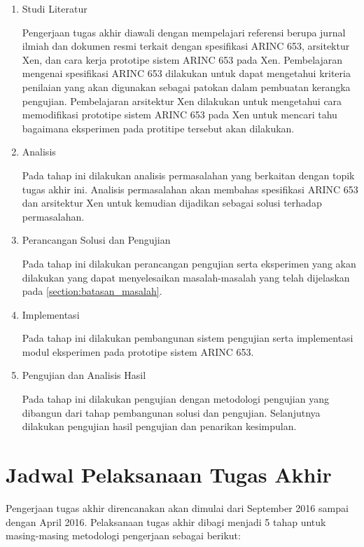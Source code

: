 \begin{enumerate}
    \item Studi Literatur

        Pengerjaan tugas akhir diawali dengan mempelajari referensi berupa jurnal ilmiah dan dokumen resmi terkait dengan spesifikasi ARINC 653, arsitektur Xen, dan cara kerja prototipe sistem ARINC 653 pada Xen.
        Pembelajaran mengenai spesifikasi ARINC 653 dilakukan untuk dapat mengetahui kriteria penilaian yang akan digunakan sebagai patokan dalam pembuatan kerangka pengujian.
        Pembelajaran arsitektur Xen dilakukan untuk mengetahui cara memodifikasi prototipe sistem ARINC 653 pada Xen untuk mencari tahu bagaimana eksperimen pada protitipe tersebut akan dilakukan.

    \item Analisis

        Pada tahap ini dilakukan analisis permasalahan yang berkaitan dengan topik tugas akhir ini.
        Analisis permasalahan akan membahas spesifikasi ARINC 653 dan arsitektur Xen untuk kemudian dijadikan sebagai solusi terhadap permasalahan.

    \item Perancangan Solusi dan Pengujian

        Pada tahap ini dilakukan perancangan pengujian serta eksperimen yang akan dilakukan yang dapat menyelesaikan masalah\hyp{}masalah yang telah dijelaskan pada \autoref{section:batasan_masalah}.

    \item Implementasi

        Pada tahap ini dilakukan pembangunan sistem pengujian serta implementasi modul eksperimen pada prototipe sistem ARINC 653.

    \item Pengujian dan Analisis Hasil

        Pada tahap ini dilakukan pengujian dengan metodologi pengujian yang dibangun dari tahap pembangunan solusi dan pengujian.
        Selanjutnya dilakukan pengujian hasil pengujian dan penarikan kesimpulan.
\end{enumerate}

\section{Jadwal Pelaksanaan Tugas Akhir}

Pengerjaan tugas akhir direncanakan akan dimulai dari September 2016 sampai dengan April 2016.
Pelaksanaan tugas akhir dibagi menjadi 5 tahap untuk masing-masing metodologi pengerjaan sebagai berikut:

